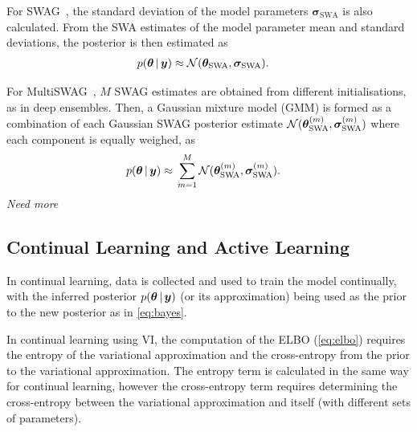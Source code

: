 \documentclass[10pt,a4paper,twocolumn]{article}
\begin{document}
For SWAG~\cite{maddox2019simple}, the standard deviation of the model parameters \(\bm \sigma_\mathrm{SWA}\) is also calculated.
From the SWA estimates of the model parameter mean and standard deviations, the posterior is then estimated as
\begin{align}\label{eq:swag}
    p(\bm \theta \, | \, \bm y) \approx{} & \mathcal{N}(\bm \theta_\mathrm{SWA}, \bm \sigma_\mathrm{SWA}).
\end{align}

For MultiSWAG~\cite{wilson2020bayesian}, \(M\) SWAG estimates are obtained from different initialisations, as in deep ensembles.
Then, a Gaussian mixture model (GMM) is formed as a combination of each Gaussian SWAG posterior estimate \(\mathcal{N}(\bm \theta_\mathrm{SWA}^{(m)}, \bm \sigma_\mathrm{SWA}^{(m)})\) where each component is equally weighed, as
\begin{align}\label{eq:multiswag}
    p(\bm \theta \, | \, \bm y) \approx{} & \sum_{m=1}^M \mathcal{N}(\bm \theta_\mathrm{SWA}^{(m)}, \bm \sigma_\mathrm{SWA}^{(m)}).
\end{align}
\emph{Need more}



\subsection{Continual Learning and Active Learning}

In continual learning, data is collected and used to train the model continually, with the inferred posterior \(p(\bm \theta \, | \, \bm y)\) (or its approximation) being used as the prior to the new posterior as in \cref{eq:bayes}.

\cite{nguyen2017variational}

In continual learning using VI, the computation of the ELBO (\cref{eq:elbo}) requires the entropy of the variational approximation and the cross-entropy from the prior to the variational approximation.
The entropy term is calculated in the same way for continual learning, however the cross-entropy term requires determining the cross-entropy between the variational approximation and itself (with different sets of parameters).
\end{document}
